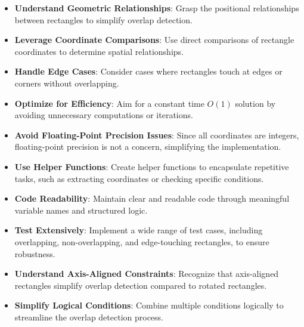 \begin{itemize}
    \item \textbf{Understand Geometric Relationships}: Grasp the positional relationships between rectangles to simplify overlap detection.
    
    \item \textbf{Leverage Coordinate Comparisons}: Use direct comparisons of rectangle coordinates to determine spatial relationships.
    
    \item \textbf{Handle Edge Cases}: Consider cases where rectangles touch at edges or corners without overlapping.
    
    \item \textbf{Optimize for Efficiency}: Aim for a constant time \(O(1)\) solution by avoiding unnecessary computations or iterations.
    
    \item \textbf{Avoid Floating-Point Precision Issues}: Since all coordinates are integers, floating-point precision is not a concern, simplifying the implementation.
    
    \item \textbf{Use Helper Functions}: Create helper functions to encapsulate repetitive tasks, such as extracting coordinates or checking specific conditions.
    
    \item \textbf{Code Readability}: Maintain clear and readable code through meaningful variable names and structured logic.
    
    \item \textbf{Test Extensively}: Implement a wide range of test cases, including overlapping, non-overlapping, and edge-touching rectangles, to ensure robustness.
    
    \item \textbf{Understand Axis-Aligned Constraints}: Recognize that axis-aligned rectangles simplify overlap detection compared to rotated rectangles.
    
    \item \textbf{Simplify Logical Conditions}: Combine multiple conditions logically to streamline the overlap detection process.
\end{itemize}

